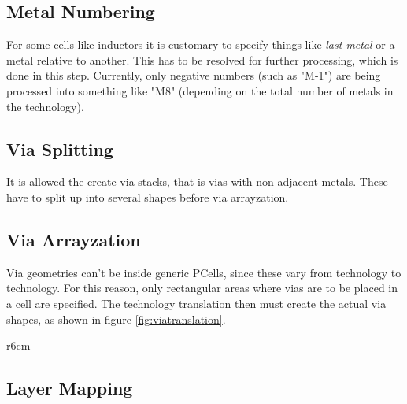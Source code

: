 \subsection{Metal Numbering}
For some cells like inductors it is customary to specify things like \emph{last metal} or a metal relative to another. This has to be resolved for further
processing, which is done in this step. Currently, only negative numbers (such as "M-1") are being processed into something like "M8" (depending on the total number
of metals in the technology).
\subsection{Via Splitting}
It is allowed the create via stacks, that is vias with non-adjacent metals. These have to split up into several shapes before via arrayzation.
\subsection{Via Arrayzation}
Via geometries can't be inside generic PCells, since these vary from technology to technology. For this reason, only rectangular areas where vias are to be placed in
a cell are specified. The technology translation then must create the actual via shapes, as shown in figure \ref{fig:viatranslation}.
\begin{wrapfigure}{r}{6cm}
    \centering
    \caption{Example of via arrayzation}
    \label{fig:viatranslation}
\end{wrapfigure}
\subsection{Layer Mapping}



